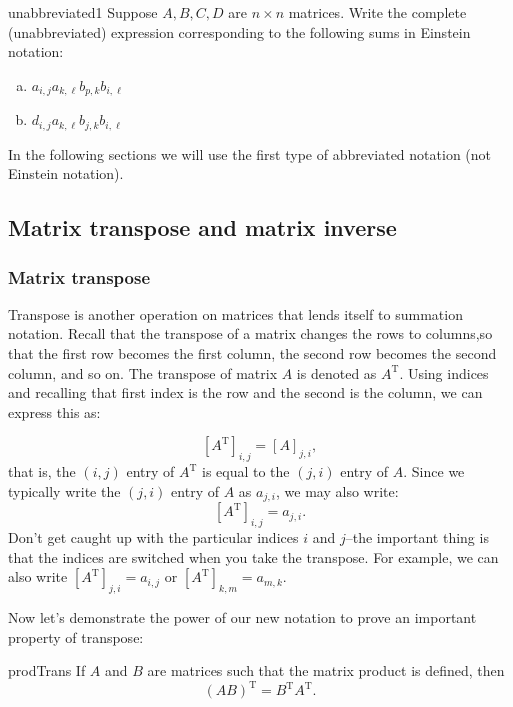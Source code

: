 \begin{exercise}{unabbreviated1}
Suppose $A,B,C,D$ are $n \times n$ matrices.  Write the complete (unabbreviated) expression corresponding to the following sums in Einstein notation:
\begin{enumerate}[(a)]
\item
$a_{i,j}a_{k,\ell}b_{p,k}b_{i,\ell}$
\item
$d_{i,j}a_{k,\ell}b_{j,k}b_{i,\ell}$
\end{enumerate}
\end{exercise}

In the following sections we will use the first type of abbreviated notation (not Einstein notation).


\subsection{Matrix transpose and matrix inverse}

\subsubsection*{Matrix transpose}
Transpose is another operation on matrices that lends itself to summation notation.  Recall that the transpose of a matrix changes the rows to columns,so that the first row becomes the first column, the second row becomes the second column, and so on.  The transpose of matrix $A$ is denoted as $A^{\text{T}}$. Using indices and recalling that first index is the row and the second is the column, we can express this as:

\[ \left[ {A}^{\text{T}} \right]_{i,j} = \left[ A \right]_{j,i}, \]
that is, the $(i,j)$ entry of $A^{\text{T}}$ is equal to the $(j,i)$ entry of $A$.  Since we typically write the $(j,i)$ entry of $A$ as $a_{j,i}$, we may also write:
\[ \left[ {A}^{\text{T}} \right]_{i,j} = a_{j,i}. \]
Don't get caught up with the particular indices $i$ and $j$--the important thing is that the indices are switched when you take the transpose.  For example, we can also write $\left[ {A}^{\text{T}} \right]_{j,i} = a_{i,j}$ or 
$\left[ {A}^{\text{T}} \right]_{k,m} = a_{m,k}$.

Now let's demonstrate the power of our new notation to prove an important property of transpose:

\begin{prop}{prodTrans}
If $A$ and $B$ are matrices such that the matrix product is defined, then 
\[ \left( {A}{B} \right)^{\text{T}} = {B}^{\text{T}} {A}^{\text{T}}. \]
\end{prop}


